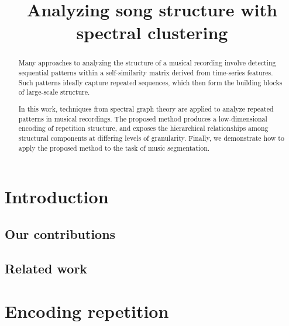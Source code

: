 \documentclass{article}
\title{Analyzing song structure with spectral clustering}
\begin{document}
%
\maketitle
%
\begin{abstract}
Many approaches to analyzing the structure of a musical recording involve detecting
sequential patterns within a self-similarity matrix derived from time-series features.
Such patterns ideally capture repeated sequences, which then form the building blocks
of large-scale structure.

In this work, techniques from spectral graph theory are applied to analyze repeated
patterns in musical recordings.  The proposed method produces a low-dimensional
encoding of repetition structure, and exposes the hierarchical relationships among
structural components at differing levels of granularity.  Finally, we demonstrate how
to apply the proposed method to the task of music segmentation.
\end{abstract}
%
\section{Introduction}\label{sec:introduction}

\subsection{Our contributions}

\subsection{Related work}


\cite{mauch2009using}


\cite{serra2012unsupervised}

\cite{kaiser2013simple}

\cite{grohganz2013converting}

\section{Encoding repetition}
\end{document}
